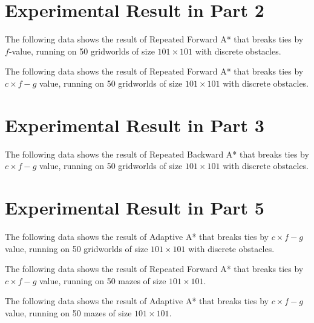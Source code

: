 \section{Experimental Result in Part 2}

The following data shows the result of Repeated Forward A* that breaks ties by
$f$-value, running on 50 gridworlds of size $101\times 101$ with discrete
obstacles.


The following data shows the result of Repeated Forward A* that breaks ties by
$c\times f-g$ value, running on 50 gridworlds of size $101\times 101$ with
discrete obstacles.


\clearpage
\section{Experimental Result in Part 3}

The following data shows the result of Repeated Backward A* that breaks ties by
$c\times f-g$ value, running on 50 gridworlds of size $101\times 101$ with
discrete obstacles.


\clearpage
\section{Experimental Result in Part 5}

The following data shows the result of Adaptive A* that breaks ties by $c\times
f-g$ value, running on 50 gridworlds of size $101\times 101$ with discrete
obstacles.


The following data shows the result of Repeated Forward A* that breaks ties by
$c\times f-g$ value, running on 50 mazes of size $101\times 101$. 


The following data shows the result of Adaptive A* that breaks ties by $c\times
f-g$ value, running on 50 mazes of size $101\times 101$. 

